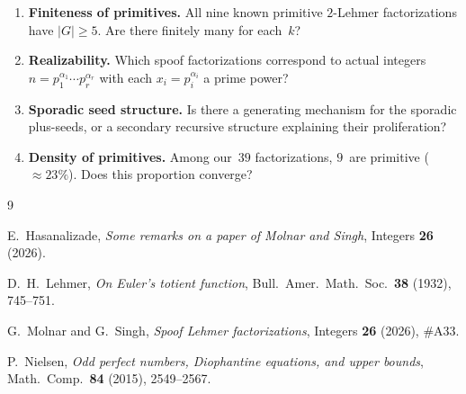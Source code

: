 \documentclass[11pt]{article}
\theoremstyle{definition}
\theoremstyle{remark}
\begin{document}
\begin{enumerate}[label=\arabic*.]
  \item \textbf{Finiteness of primitives.}  All nine known primitive
    $2$-Lehmer factorizations have $|G| \ge 5$.  Are there finitely many
    for each~$k$?

  \item \textbf{Realizability.}  Which spoof factorizations correspond
    to actual integers $n = p_1^{\alpha_1} \cdots p_r^{\alpha_r}$ with
    each $x_i = p_i^{\alpha_i}$ a prime power?

  \item \textbf{Sporadic seed structure.}  Is there a generating mechanism
    for the sporadic plus-seeds, or a secondary recursive structure
    explaining their proliferation?

  \item \textbf{Density of primitives.}  Among our~$39$ factorizations,
    $9$~are primitive (${\approx}23\%$).  Does this proportion converge?
\end{enumerate}


\begin{thebibliography}{9}

E.~Hasanalizade, \emph{Some remarks on a paper of Molnar and Singh},
Integers \textbf{26} (2026).

D.~H.~Lehmer, \emph{On Euler's totient function}, Bull.\ Amer.\ Math.\
Soc.\ \textbf{38} (1932), 745--751.

G.~Molnar and G.~Singh, \emph{Spoof Lehmer factorizations}, Integers
\textbf{26} (2026), \#A33.

P.~Nielsen, \emph{Odd perfect numbers, Diophantine equations, and upper
bounds}, Math.\ Comp.\ \textbf{84} (2015), 2549--2567.

\end{thebibliography}
\end{document}
